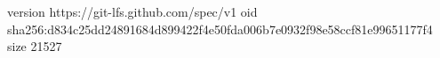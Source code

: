 version https://git-lfs.github.com/spec/v1
oid sha256:d834c25dd24891684d899422f4e50fda006b7e0932f98e58ccf81e99651177f4
size 21527
